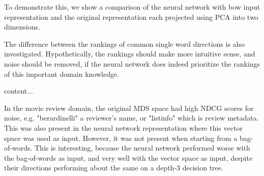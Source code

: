 
To demonstrate this, we show a comparison of the neural network with bow input representation and the original representation each projected using PCA into two dimensions.


The difference between the rankings of common single word directions is also investigated. Hypothetically, the rankings should make more intuitive sense, and noise should be removed, if the neural network does indeed prioritize the rankings of this important domain knowledge.






\begin{table}[]\label{For movies Top directions +}
	content...
\end{table}
 
In the movie review domain, the original MDS space had high NDCG scores for noise, e.g. "berardinelli" a reviewer's name, or "listinfo" which is review metadata. This was also present in the neural network representation where this vector space was used as input. However, it was not present when starting from a bag-of-words. This is interesting, because the neural network performed worse with the bag-of-words as input, and very well with the vector space as input, despite their directions performing about the same on a depth-3 decision tree.


